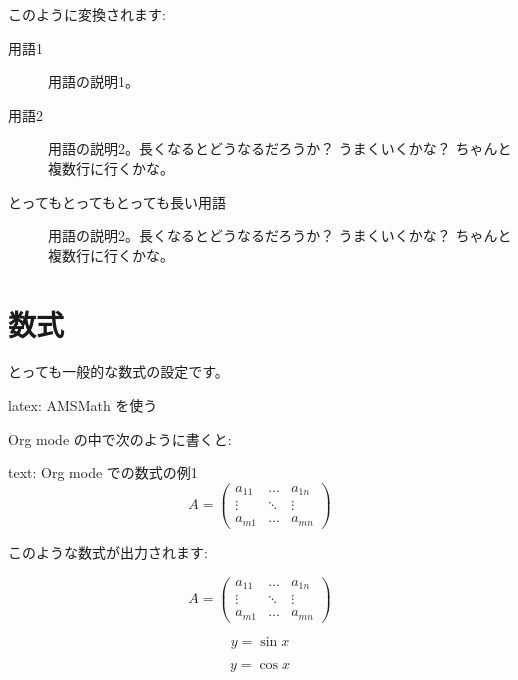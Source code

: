 \documentclass[dvipdfmx,a4j,14pt,uplatex,openany]{jsbook}
\begin{document}
このように変換されます:


\begin{description}
\item[{用語1}] 用語の説明1。
\item[{用語2}] 用語の説明2。長くなるとどうなるだろうか？ 
うまくいくかな？
ちゃんと複数行に行くかな。
\item[{とってもとってもとっても長い用語}] 用語の説明2。長くなるとどうなるだろうか？ 
うまくいくかな？
ちゃんと複数行に行くかな。
\end{description}

\section{数式}
\label{sec:org5d54d3d}
とっても一般的な数式の設定です。

\begin{programlist}[label={org6cdec55}]{latex}{: AMSMath を使う}\usepackage{amsmath,amssymb}
\usepackage{bm}
\end{programlist}

Org mode の中で次のように書くと:

\begin{programlist}[label={orgfba8895}]{text}{: Org mode での数式の例1}\begin{equation}
  A = \begin{pmatrix}
        a_{11} & \ldots & a_{1n} \\
        \vdots & \ddots & \vdots \\
        a_{m1} & \ldots & a_{mn}
      \end{pmatrix}
\end{equation}
\end{programlist}

このような数式が出力されます:

\begin{equation}
  A = \begin{pmatrix}
        a_{11} & \ldots & a_{1n} \\
        \vdots & \ddots & \vdots \\
        a_{m1} & \ldots & a_{mn}
      \end{pmatrix}
\end{equation}


\begin{equation}
    y = \sin x  \label{eq:1}
\end{equation}

\begin{equation}
    y = \cos x  \label{eq:2}
\end{equation}
\end{document}
